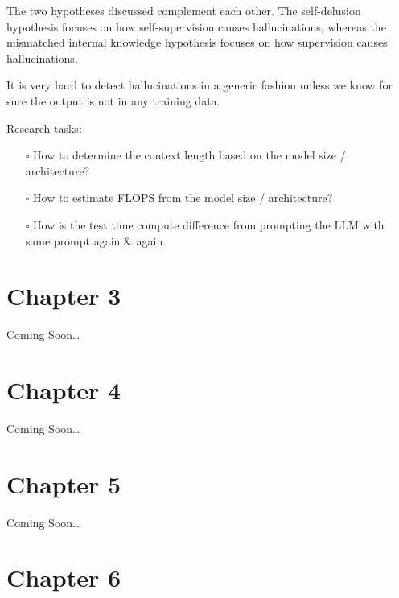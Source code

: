 \documentclass[
  letterpaper,
  DIV=11,
  numbers=noendperiod]{scrreprt}
\providecommand{\tightlist}{%
  \setlength{\itemsep}{0pt}\setlength{\parskip}{0pt}}\usepackage{longtable,booktabs,array}
\begin{document}
The two hypotheses discussed complement each other. The self-delusion
hypothesis focuses on how self-supervision causes hallucinations,
whereas the mismatched internal knowledge hypothesis focuses on how
supervision causes hallucinations.

It is very hard to detect hallucinations in a generic fashion unless we
know for sure the output is not in any training data.

Research tasks:

\begin{itemize}
\tightlist
\item[$\square$]
  How to determine the context length based on the model size /
  architecture?
\item[$\square$]
  How to estimate FLOPS from the model size / architecture?
\item[$\square$]
  How is the test time compute difference from prompting the LLM with
  same prompt again \& again.
\end{itemize}


\chapter*{Chapter 3}\label{chapter-3}


Coming Soon\ldots{}


\chapter*{Chapter 4}\label{chapter-4}


Coming Soon\ldots{}


\chapter*{Chapter 5}\label{chapter-5}


Coming Soon\ldots{}


\chapter*{Chapter 6}\label{chapter-6}
\end{document}
